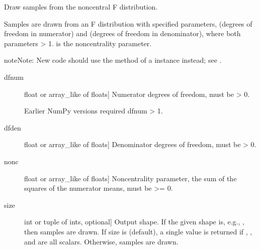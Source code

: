 \documentclass[letterpaper,10pt,english]{sphinxmanual}
\begin{document}

\begin{fulllineitems}
\label{\detokenize{infrapy.utils:infrapy.utils.ref2sac.noncentral_f}}
Draw samples from the noncentral F distribution.

Samples are drawn from an F distribution with specified parameters,
 (degrees of freedom in numerator) and  (degrees of
freedom in denominator), where both parameters \textgreater{} 1.
 is the non\sphinxhyphen{}centrality parameter.

\begin{sphinxadmonition}{note}{Note:}
New code should use the  method of a 
instance instead; see .
\end{sphinxadmonition}
\begin{description}
\item[{dfnum}] \leavevmode{[}float or array\_like of floats{]}
Numerator degrees of freedom, must be \textgreater{} 0.

Earlier NumPy versions required dfnum \textgreater{} 1.

\item[{dfden}] \leavevmode{[}float or array\_like of floats{]}
Denominator degrees of freedom, must be \textgreater{} 0.

\item[{nonc}] \leavevmode{[}float or array\_like of floats{]}
Non\sphinxhyphen{}centrality parameter, the sum of the squares of the numerator
means, must be \textgreater{}= 0.

\item[{size}] \leavevmode{[}int or tuple of ints, optional{]}
Output shape.  If the given shape is, e.g., , then
 samples are drawn.  If size is  (default),
a single value is returned if , , and 
are all scalars.  Otherwise, 
samples are drawn.


\end{description}
\end{fulllineitems}
\end{document}
